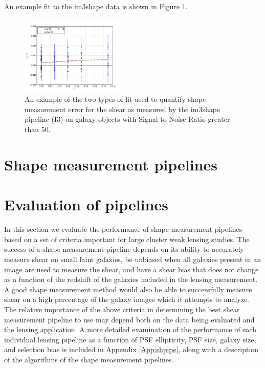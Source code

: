 \documentclass[useAMS,usenatbib]{mn2e}
\begin{document}
An example fit to the im3shape data is shown in Figure
\ref{fig:eqfit}. \\

\begin{figure}
 \centering  %
  \includegraphics[width=0.45\textwidth]{fig/fitplt.pdf} 
  \caption{An example of the two types of fit used to quantify shape
    measurement error for the shear as measured by the im3shape
    pipeline (I3) on galaxy objects with Signal
    to Noise Ratio greater than 50. }
\label{fig:eqfit}
\end{figure}




\section{Shape measurement pipelines}




\section{Evaluation of pipelines}
In this section we evaluate the performance of shape measurement 
pipelines based on a set of criteria important for large cluster weak
lensing studies. The success of a shape measurement pipeline depends
on its ability to accurately measure shear on small faint galaxies, be unbiased
when all galaxies present in an image are used to measure the shear, and
have a shear bias that does not change as a function of the redshift
of the galaxies included in the lensing measurement. A good shape
measurement method would also be able to successfully measure shear on
a high percentage of the galaxy images which it attempts to analyze. 
The relative importance of the above criteria in determining
the best shear measurement pipeline to use may depend both on the 
data being evaluated and the lensing application. A more detailed examination
of the performance of each individual lensing pipeline 
as a function of PSF ellipticity, PSF size, galaxy size, 
and selection bias is included in Appendix \ref{App:shpipe}, along
with a description of the algorithms of the shape measurement pipelines. \\
\end{document}
